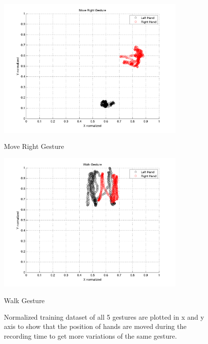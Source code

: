 \begin{figure}
\begin{minipage}
	\end{minipage}
	\begin{minipage}
		{.5 
		\textwidth} 
		\includegraphics[height=70mm]{figures/result/train-move-right.png} \caption*{Move Right Gesture} 
	\end{minipage}
	\begin{minipage}
		{.5 
		\textwidth} \hspace{-15 mm} 
		\includegraphics[height=70mm]{figures/result/train-walk.png} \caption*{Walk Gesture} 
	\end{minipage}
	\caption{Normalized training dataset of all 5 gestures are plotted in x and y axis to show that the position of hands are moved during the recording time to get more variations of the same gesture.} \label{pl:ges:pos} 
\end{figure}
